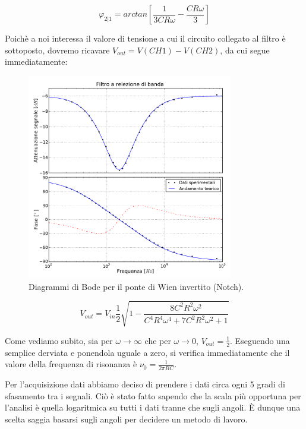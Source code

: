 \begin{equation}
\varphi_{2|1}=arctan[\frac{1}{3 C R \omega}-\frac{C R \omega}{3}]
\label{eq:F12}
\end{equation}

Poichè a noi interessa il valore di tensione a cui il circuito collegato al filtro è sottoposto, dovremo ricavare $V_{out}=V(CH1)-V(CH2)$, da cui segue immediatamente:

\begin{figure}
    \includegraphics[width=90mm]{notch2.pdf}
    \caption{Diagrammi di Bode per il ponte di Wien invertito \phantom {trollolollo} (Notch).}
    \label{fig:notch}
\end{figure}

\begin{equation}
V_{out}=V_{in} \frac{1}{2} \sqrt{1-\frac{8 C^2 R^2 \omega^2}{C^4 R^4 \omega^4+7 C^2 R^2 \omega^2+1}}
\end{equation}


Come vediamo subito, sia per $\omega \rightarrow \infty$ che per $\omega \rightarrow 0$, $V_{out}=\frac{1}{2}$. Eseguendo una semplice derviata e ponendola uguale a zero, si verifica immediatamente che il valore della frequenza di risonanza è $\nu_0=\frac{1}{2 \pi R C}$.

Per l'acquisizione dati abbiamo deciso di prendere i dati circa ogni 5 gradi di sfasamento tra i segnali. Ciò è stato fatto sapendo che la scala più opportuna per l'analisi è quella logaritmica su tutti i dati tranne che sugli angoli. \`E dunque una scelta saggia basarsi sugli angoli per decidere un metodo di lavoro.


